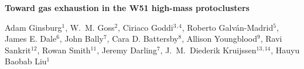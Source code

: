 \documentclass[]{article}
\newcommand{\eso}{$^{1}$}
\newcommand{\nrao}{$^{2}$}
\newcommand{\radboud}{$^{3}$}
\newcommand{\allegro}{$^{4}$}
\newcommand{\morelia}{$^{5}$}
\newcommand{\excellence}{$^{6}$}
\newcommand{\casa}{$^{7}$}
\newcommand{\cfa}{$^{8}$}
\newcommand{\lasp}{$^{9}$}
\newcommand{\jodrell}{$^{11}$}
\newcommand{\sofia}{$^{12}$}
\newcommand{\mpia}{$^{13}$}
\newcommand{\iah}{$^{14}$}
\begin{document}
{\large\bf{Toward gas exhaustion in the W51 high-mass protoclusters}}

{\bf{ 

Adam Ginsburg{\eso},
W.~M. Goss{\nrao}, Ciriaco Goddi{\radboud$^{,}$\allegro}, Roberto Galv{\'a}n-Madrid{\morelia}, James E. Dale\excellence, John Bally{\casa}, Cara D.
Battersby{\cfa}, Allison Youngblood{\lasp}, Ravi Sankrit{\sofia}, Rowan Smith{\jodrell}, Jeremy Darling\casa, J.~M.~Diederik Kruijssen{\mpia$^{,}$\iah},
Hauyu Baobab Liu{\eso}
}}

\end{document}
